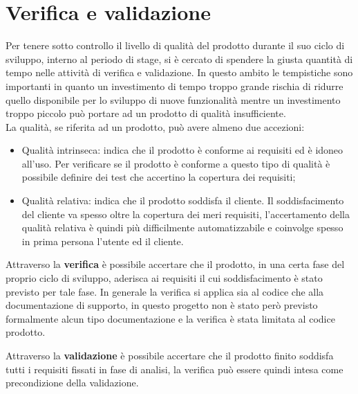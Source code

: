
\chapter{Verifica e validazione}
\label{cap:verifica-validazione}
Per tenere sotto controllo il livello di qualità del prodotto durante il suo ciclo di sviluppo, interno al periodo di stage, si è cercato di spendere la giusta quantità di tempo nelle attività di verifica e validazione. In questo ambito le tempistiche sono importanti in quanto un investimento di tempo troppo grande rischia di ridurre quello disponibile per lo sviluppo di nuove funzionalità mentre un investimento troppo piccolo può portare ad un prodotto di qualità insufficiente. \\
La qualità, se riferita ad un prodotto, può avere almeno due accezioni:

\begin{itemize}
	\item Qualità intrinseca: indica che il prodotto è conforme ai requisiti ed è idoneo all'uso. Per verificare se il prodotto è conforme a questo tipo di qualità è possibile definire dei test che accertino la copertura dei requisiti;
	\item Qualità relativa: indica che il prodotto soddisfa il cliente. Il soddisfacimento del cliente va spesso oltre la copertura dei meri requisiti, l'accertamento della qualità relativa è quindi più difficilmente automatizzabile e coinvolge spesso in prima persona l'utente ed il cliente.
\end{itemize}

Attraverso la \textbf{verifica} è possibile accertare che il prodotto, in una certa fase del proprio ciclo di sviluppo, aderisca ai requisiti il cui soddisfacimento è stato previsto per tale fase. In generale la verifica si applica sia al codice che alla documentazione di supporto, in questo progetto non è stato però previsto formalmente alcun tipo documentazione e la verifica è stata limitata al codice prodotto. \bigskip

Attraverso la \textbf{validazione} è possibile accertare che il prodotto finito soddisfa tutti i requisiti fissati in fase di analisi, la verifica può essere quindi intesa come precondizione della validazione. \bigskip

